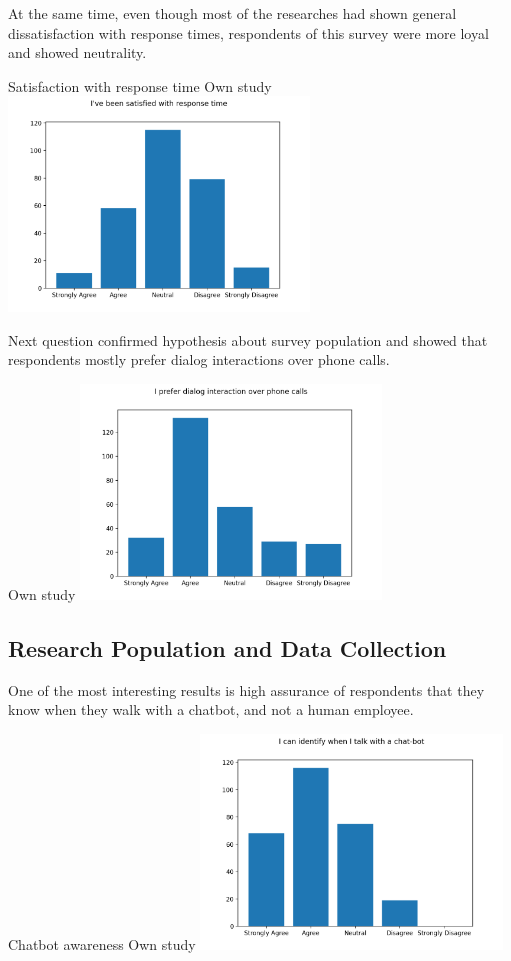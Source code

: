 At the same time, even though most of the researches had shown general dissatisfaction with response times, respondents of this survey were more loyal and showed neutrality.

\mtfigure
{Satisfaction with response time}
{Own study}
{
    \includegraphics[width=0.6\textwidth,height=\textheight,keepaspectratio]{survey/5_i've_been_satisfied_with_response_time.png}
}

Next question confirmed hypothesis about survey population and showed that respondents mostly prefer dialog interactions over phone calls.

{Own study}
{
    \includegraphics[width=0.6\textwidth,height=\textheight,keepaspectratio]{survey/6_i_prefer_dialog_interaction_over_phone_calls.png}
}






\subsection{Research Population and Data Collection}

One of the most interesting results is high assurance of respondents that they know when they walk with a chatbot, and not a human employee.

\mtfigure
{Chatbot awareness}
{Own study}
{
    \includegraphics[width=0.6\textwidth,height=\textheight,keepaspectratio]{survey/7_i_can_identify_when_i_talk_with_a_chat-bot.png}
}

